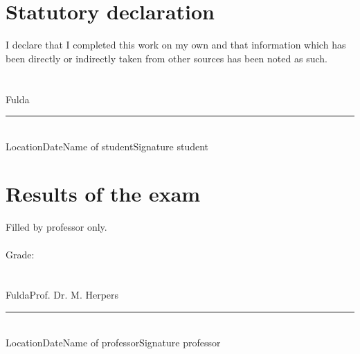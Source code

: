 \documentclass[12pt]{article}
\makeatletter
\let\theauthor\@author
\let\thedate\@date
\makeatother
\begin{document}
\tableofcontents
\pagebreak


\section{Statutory declaration}
I declare that I completed this work on my own and that information which has been directly or indirectly taken from other sources has been noted as such. \\ \\ \\
Fulda\hspace{35pt}\thedate\hspace{25pt}\theauthor \\
\noindent\rule{\linewidth}{0.4pt}\\
Location\hspace{50pt}Date\hspace{50pt}Name of student\hspace{70pt}Signature student

\section{Results of the exam} 
Filled by professor only. \\ \\
Grade: \\ \\ \\
Fulda\hspace{130pt}Prof. Dr. M. Herpers \\
\noindent\rule{\linewidth}{0.4pt}\\
Location\hspace{50pt}Date\hspace{50pt}Name of professor\hspace{60pt}Signature professor

\newpage
\end{document}
